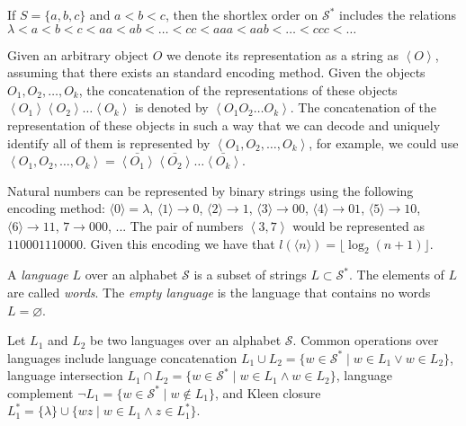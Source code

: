 \begin{example}
If $S = \{a, b, c\}$ and $a < b < c$, then the shortlex order on $\mathcal{S}^{\ast}$ includes the relations $\lambda < a < b < c < aa < ab < \ldots < cc < aaa < aab < \ldots < ccc < \ldots$
\end{example}

Given an arbitrary object $O$ we denote its representation as a string as $\left\langle O\right\rangle$, assuming that there exists an standard encoding method. Given the objects $O_{1},O_{2},\ldots,O_{k}$, the concatenation of the representations of these objects $\left\langle O_1 \right\rangle \left\langle O_2 \right\rangle \ldots \left\langle O_k \right\rangle$ is denoted by $\left\langle O_1 O_2 \ldots O_k \right\rangle$. The concatenation of the representation of these objects in such a way that we can decode and uniquely identify all of them is represented by $\left\langle O_1, O_2,\ldots,O_k \right\rangle$, for example, we could use $\left\langle O_1, O_2,\ldots,O_k \right\rangle = \bar{\left\langle O_1 \right\rangle} \bar{\left\langle O_2 \right\rangle} \ldots \bar{\left\langle O_k \right\rangle}$.

\begin{example}
Natural numbers can be represented by binary strings using the following encoding method: $\langle 0 \rangle = \lambda$, $\langle 1 \rangle \rightarrow 0$, $\langle 2 \rangle \rightarrow 1$, $\langle 3 \rangle \rightarrow 00$, $\langle 4 \rangle \rightarrow 01$, $\langle 5 \rangle \rightarrow 10$, $\langle 6 \rangle \rightarrow 11$, $7 \rightarrow 000$, ... The pair of numbers $\left\langle 3, 7 \right\rangle$ would be represented as $110001110000$. Given this encoding we have that $l \left( \langle n \rangle \right) = \lfloor \log_2 (n + 1) \rfloor$.
\end{example}

A \emph{language} $L$ over an alphabet $\mathcal{S}$ is a subset of strings $L \subset \mathcal{S}^{\ast}$. The elements of $L$ are called \emph{words}. The \emph{empty language} is the language that contains no words $L = \varnothing$. 

Let $L_1$ and $L_2$ be two languages over an alphabet $\mathcal{S}$. Common operations over languages include language concatenation $L_1 \cup L_2 = \{ w \in \mathcal{S}^{\ast} \mid w \in L_1 \lor w \in L_2 \}$, language intersection $L_1 \cap L_2 = \{ w \in \mathcal{S}^{\ast} \mid w \in L_1 \land w \in L_2 \}$, language complement $\lnot L_1 = \{ w \in \mathcal{S}^{\ast} \mid w \notin L_1 \}$, and Kleen closure $L_1^\ast = \{ \lambda \} \cup \{ wz \mid w \in L_1 \land z \in L_1^\ast \}$. 

